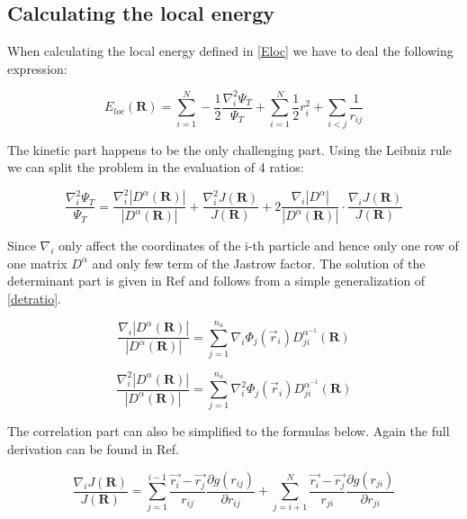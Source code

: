 \subsection{Calculating the local energy}

When calculating the local energy defined in \autoref{Eloc} we have to deal the following expression:

\begin{equation}
  E_{loc}(\bm{R})=\sum_{i=1}^N -\frac{1}{2}\dfrac{\nabla_i^2\Psi_T}{\Psi_T} +\sum_{i=1}^N \frac{1}{2}r_i^2 +\sum_{i<j}\dfrac{1}{r_{ij}}
\end{equation}

The kinetic part happens to be the only challenging part.
Using the Leibniz rule we can split the problem in the evaluation of 4 ratios:

\begin{equation}
  \dfrac{\nabla_i^2\Psi_T}{\Psi_T}=\dfrac{\nabla_i^2|D^\alpha(\bm{R})|}{|D^\alpha(\bm{R})|} + \dfrac{\nabla_i^2J(\bm{R})}{J(\bm{R})} + 2\dfrac{\nabla_i |D^\alpha|}{|D^\alpha(\bm{R})|}\cdot\dfrac{\nabla_iJ(\bm{R})}{J(\bm{R})}
\end{equation}

Since $\nabla_i$ only affect the coordinates of the i-th particle and hence only one row of one matrix $D^\alpha$ and only few term of the Jastrow factor.
The solution of the determinant part is given in Ref\cite{notesOslo} and follows from a simple generalization of \autoref{detratio}.

\begin{equation}
  \dfrac{\nabla_i|D^\alpha(\bm{R})|}{|D^\alpha(\bm{R})|}=\sum_{j=1}^{n_{\alpha}}\nabla_i\Phi_{j}(\vec{r}_i)D^{\alpha^{-1}}_{ji}(\bm{R})
  \label{detratio}
\end{equation}

\begin{equation}
  \dfrac{\nabla_i^2|D^\alpha(\bm{R})|}{|D^\alpha(\bm{R})|}=\sum_{j=1}^{n_{\alpha}}\nabla_i^2\Phi_{j}(\vec{r}_i)D^{\alpha^{-1}}_{ji}(\bm{R})
  \label{detratio}
\end{equation}

The correlation part can also be simplified to the formulas below.
Again the full derivation can be found in Ref\cite{notesOslo}.

\begin{equation}
  \dfrac{\nabla_iJ(\bm{R})}{J(\bm{R})}=\sum_{j=1}^{i-1}\dfrac{\vec{r_i}-\vec{r_j}}{r_{ij}}\dfrac{\partial g(r_{ij})}{\partial r_{ij}}
  + \sum_{j=i+1}^N\dfrac{\vec{r_i}-\vec{r_j}}{r_{ji}}\dfrac{\partial g(r_{ji})}{\partial r_{ji}}
\end{equation}

